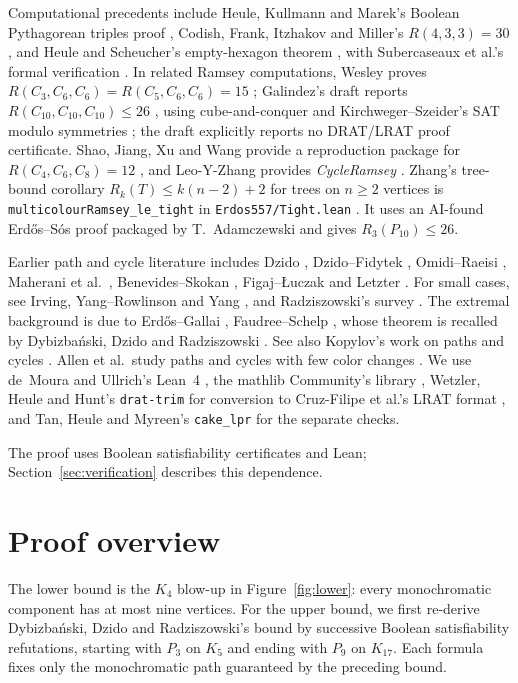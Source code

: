\documentclass[11pt]{article}
\theoremstyle{definition}
\theoremstyle{remark}
\newcommand{\R}{R_3}
\begin{document}
Computational precedents include Heule, Kullmann and Marek's
Boolean Pythagorean triples proof \cite[Theorem~1]{HKM16}, Codish, Frank,
Itzhakov and Miller's $R(4,3,3)=30$ \cite{CFIM16}, and Heule and
Scheucher's empty-hexagon theorem \cite{HS24}, with Subercaseaux et al.'s
formal verification \cite{SNG+24}. In related Ramsey computations, Wesley
proves $R(C_3,C_6,C_6)=R(C_5,C_6,C_6)=15$
\cite[Theorems~3 and~4]{Wes25}; Galindez's draft reports
$R(C_{10},C_{10},C_{10})\le26$ \cite[Theorem~1]{Gal26}, using
cube-and-conquer and Kirchweger--Szeider's SAT modulo symmetries
\cite{KS24}; the draft explicitly reports no DRAT/LRAT proof certificate.
Shao, Jiang, Xu and Wang provide a
reproduction package for $R(C_4,C_6,C_8)=12$ \cite{SJXW26}, and
Leo-Y-Zhang provides \textit{CycleRamsey} \cite{Zha26}.
Zhang's tree-bound corollary $R_k(T)\le k(n-2)+2$ for trees on $n\ge2$
vertices is \texttt{multicolourRamsey\_le\_tight} in
\texttt{Erdos557/Tight.lean} \cite{ZhJ26}. It uses an AI-found
Erdős--Sós proof packaged by T.~Adamczewski and gives $\R(P_{10})\le26$.

Earlier path and cycle literature includes Dzido \cite{Dzi05},
Dzido--Fidytek \cite{DF09}, Omidi--Raeisi \cite{OR11},
Maherani et al.\ \cite[Theorem~1.1]{MORS15}, Benevides--Skokan
\cite{BS09}, Figaj--Łuczak \cite{FL07} and Letzter \cite{Let22}.
For small cases, see Irving, Yang--Rowlinson and Yang
\cite{Irv74,YR94,YR92,Yan95}, and Radziszowski's survey
\cite{Rad26}.
The extremal background is due to Erdős--Gallai \cite{EG59},
Faudree--Schelp \cite{FS75}, whose theorem is recalled by Dybizbański,
Dzido and Radziszowski \cite[Theorem~4]{DDR16}. See also Kopylov's work on paths and cycles \cite{Kop77}.
Allen et al.\ study paths and cycles with few color changes
\cite{ABC+26}.
We use de~Moura and Ullrich's Lean~4 \cite{MU21}, the mathlib Community's
library \cite{Mathlib20}, Wetzler, Heule and Hunt's \texttt{drat-trim}
\cite{WHH14} for conversion to Cruz-Filipe et al.'s LRAT format
\cite{CHH+17}, and Tan, Heule and Myreen's \texttt{cake\_lpr}
\cite{THM21} for the separate checks.

The proof uses Boolean satisfiability certificates and Lean;
Section~\ref{sec:verification} describes this dependence.

\section{Proof overview}
The lower bound is the $K_4$ blow-up in Figure~\ref{fig:lower}: every
monochromatic component has at most nine vertices. For the upper bound,
we first re-derive Dybizbański, Dzido and Radziszowski's bound
\cite[Theorem~8]{DDR16} by successive Boolean satisfiability refutations,
starting with $P_3$ on $K_5$ and ending with $P_9$ on $K_{17}$.
Each formula fixes only the monochromatic path guaranteed by the
preceding bound.
\end{document}
